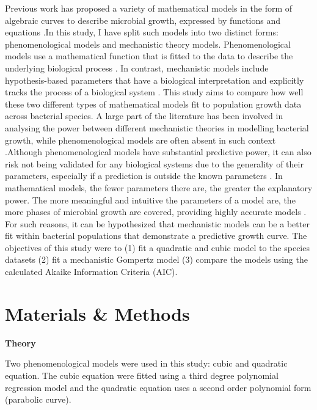 \documentclass[11pt]{article}
\begin{document}
Previous work has proposed a variety of mathematical models in the form of algebraic curves to describe 
microbial growth, expressed by functions and equations \cite{soboleva_predictive_2000,peleg_microbial_2011}.In this study, I have split such 
models into two distinct forms: phenomenological models and mechanistic theory models. Phenomenological 
models use a mathematical function that is fitted to the data to describe the underlying biological process \cite{white_should_2019}.
In contrast, mechanistic models include hypothesis-based parameters that have a biological interpretation 
and explicitly tracks the process of a biological system \cite{geritz_mathematical_2012}. This study aims to compare how well 
these two different types of mathematical models fit to population growth data across bacterial species. A 
large part of the literature has been involved in analysing the power between different mechanistic theories 
in modelling bacterial growth, while phenomenological models are often absent in such context \cite{gibson_predicting_1988,adair_comparison_1989,labuza_growth_1993,mackey_effect_1988}.Although
phenomenological models have substantial predictive power, it can also risk not being validated for any
biological systems due to the generality of their parameters, especially if a prediction is outside the known 
parameters \cite{heitzer_utility_1991,schiraldi_phenomenological_nodate,geritz_mathematical_2012}. In mathematical models, the fewer parameters there are, the greater the explanatory
power. The more meaningful and intuitive the parameters of a model are, the more phases of microbial growth
are covered, providing highly accurate models \cite{esser_modeling_2015}. For such reasons, it can be hypothesized that mechanistic
models can be a better fit within bacterial populations that demonstrate a predictive growth 
curve. The objectives of this study were to (1) fit a quadratic and cubic model to the species datasets (2) 
fit a mechanistic Gompertz model (3) compare the models using the calculated Akaike Information Criteria 
(AIC). 

\section{Materials \& Methods}

\noindent\textbf{Theory}

Two phenomenological models were used in this study: cubic and quadratic equation. The cubic equation were
fitted using a third degree polynomial regression model and the quadratic equation uses a second order
polynomial form (parabolic curve).
\end{document}

